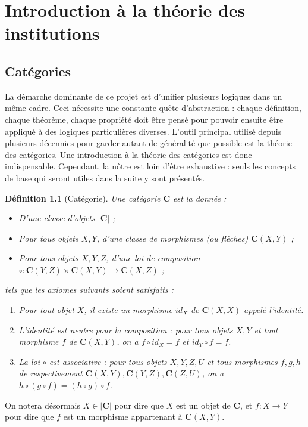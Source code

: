 \documentclass[11pt,a4paper]{report}
\newtheorem{defi}[theo]{Définition}
\newcommand{\itemz}{\item[$\triangleright$]}
\newcommand{\gr}{\textbf}
\newcommand{\1}{\mathbbm{1}}
\begin{document}
\chapter{Introduction à la théorie des institutions}

\section{Catégories}
La démarche dominante de ce projet est d'unifier plusieurs logiques dans un même cadre. Ceci nécessite une constante quête d'abstraction : chaque définition, chaque théorème, chaque propriété doit être pensé pour pouvoir ensuite être appliqué à des logiques particulières diverses. L'outil principal utilisé depuis plusieurs décennies pour garder autant de généralité que possible est la théorie des catégories. Une introduction à la théorie des catégories est donc indispensable. Cependant, la nôtre est loin d'être exhaustive : seuls les concepts de base qui seront utiles dans la suite y sont présentés.
\begin{defi}[Catégorie]
Une catégorie $\gr{C}$ est la donnée :
\begin{itemize}
\setlength\itemsep{-0.3em}
\itemz D'une classe d'objets $|\gr{C}|$ ;
\itemz Pour tous objets $X,Y$, d'une classe de morphismes (ou flèches) $\gr{C}(X,Y)$ ;
\itemz Pour tous objets $X,Y,Z$, d'une loi de composition $\circ : \gr{C}(Y,Z) \times \gr{C}(X,Y) \to \gr{C}(X,Z)$ ;
\end{itemize}
tels que les axiomes suivants soient satisfaits :
\begin{enumerate}
\setlength\itemsep{-0.3em}
\item[(i)] Pour tout objet $X$, il existe un morphisme $id_X$ de $\gr{C}(X,X)$ appelé l'identité.
\item[(ii)] L'identité est neutre pour la composition : pour tous objets $X,Y$ et tout morphisme $f$ de $\gr{C}(X,Y)$, on a  $f \circ id_X = f$ et $id_Y \circ f = f$.
\item[(iii)] La loi $\circ$ est associative : pour tous objets $X,Y,Z,U$ et tous morphismes $f,g,h$ de respectivement $\gr{C}(X,Y), \gr{C}(Y,Z), \gr{C}(Z,U)$, on a $h \circ (g \circ f) = (h \circ g) \circ f$.
\end{enumerate}
\end{defi}
On notera désormais $X \in |\gr{C}|$ pour dire que $X$ est un objet de $\gr{C}$, et $f : X \to Y$ pour dire que $f$ est un morphisme appartenant à $\gr{C}(X,Y)$.\\\\
\end{document}
